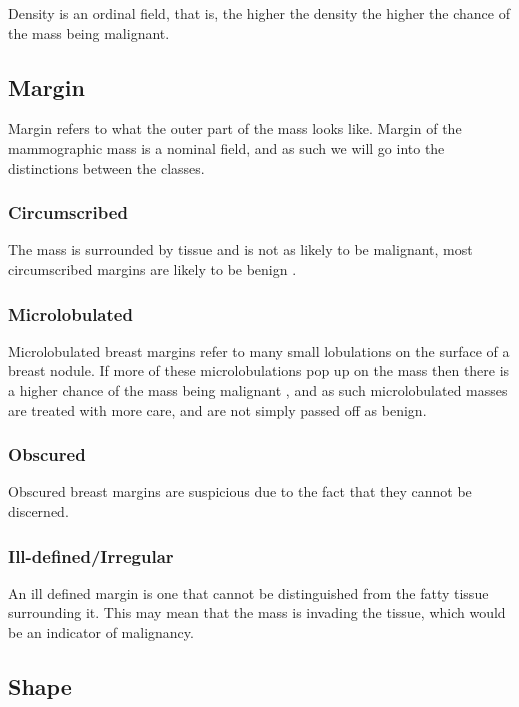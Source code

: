 \documentclass[12pt]{article}
\begin{document}
Density is an ordinal field, that is, the higher the density the higher the chance of the mass being malignant.

\subsection{Margin}

Margin refers to what the outer part of the mass looks like. Margin of the mammographic mass is a nominal field, and as such we will go into the distinctions between the classes. 

\subsubsection{Circumscribed}

The mass is surrounded by tissue and is not as likely to be malignant, most circumscribed margins are likely to be benign \cite{shapeMarginDensity, birads}.

\subsubsection{Microlobulated}

Microlobulated breast margins refer to many small lobulations on the surface of a breast nodule. If more of these microlobulations pop up on the mass then there is a higher chance of the mass being malignant \cite{benignOrMalignant}, and as such microlobulated masses are treated with more care, and are not simply passed off as benign.

\subsubsection{Obscured}

Obscured breast margins are suspicious due to the fact that they cannot be discerned.

\subsubsection{Ill-defined/Irregular}
An ill defined margin is one that cannot be distinguished from the fatty tissue surrounding it. This may mean that the mass is invading the tissue, which would be an indicator of malignancy.

\subsection{Shape}
\end{document}
